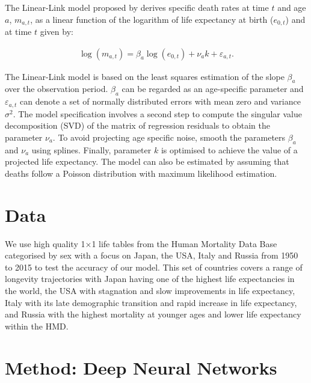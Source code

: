 \documentclass[a4,11pt]{article}
\begin{document}
The Linear-Link model proposed by \citet{PascariuLL} derives specific death rates at time $t$ and age $a$, $m_{a,t}$, as a linear function of the logarithm of life expectancy at birth ($e_{0,t}$) and at time $t$ given by:

	\begin{equation}
	\label{eq.LinearLink}
	\begin{array}{l}
	\log{\left(m_{a,t}\right)}=\beta_{a} \log(e_{0,t})+\nu_{a} k+\varepsilon_{a,t}.
	\end{array}
	\end{equation}
	
The Linear-Link model is based on the least squares estimation of the slope $\beta_a$ over the observation period. $\beta_a$ can be regarded as an age-specific parameter and $\varepsilon_{a,t}$ can denote a set of normally distributed errors with mean zero and variance $\sigma^{2}$. The model specification involves a second step to compute the singular value decomposition (SVD) of the matrix of regression residuals to obtain the parameter $\nu_{a}$. To avoid projecting age specific noise, \citet{PascariuLL} smooth the parameters $\beta_{a}$ and $\nu_{a}$ using splines. Finally, parameter $k$ is optimised to achieve the value of a projected life expectancy. The model can also be estimated by assuming that deaths follow a Poisson distribution with maximum likelihood estimation. 


\section{Data}
We use high quality 1$\times$1 life tables from the Human Mortality Data Base \citep{HM} categorised by sex with a focus on Japan, the USA, Italy and Russia from 1950 to 2015 to test the accuracy of our model. This set of countries covers a range of longevity trajectories with Japan having one of the highest life expectancies in the world, the USA with stagnation and slow improvements in life expectancy, Italy with its late demographic transition and rapid increase in life expectancy, and Russia with the highest mortality at younger ages and lower life expectancy within the HMD.

\section{Method: Deep Neural Networks}
\label{sec:2}
\end{document}
